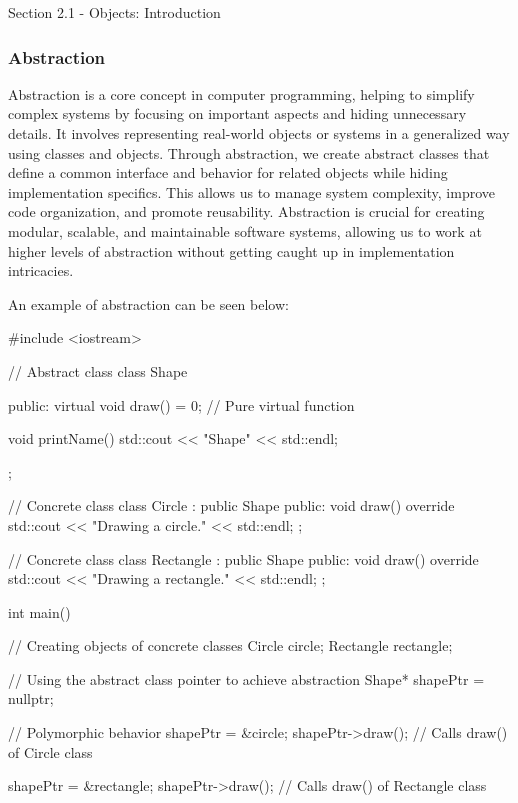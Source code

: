 \begin{notes}{Section 2.1 - Objects: Introduction}
    \subsubsection*{Abstraction}
    
    Abstraction is a core concept in computer programming, helping to simplify complex systems by focusing on important aspects and hiding unnecessary details. It involves representing real-world objects or systems in a generalized 
    way using classes and objects. Through abstraction, we create abstract classes that define a common interface and behavior for related objects while hiding implementation specifics. This allows us to manage system complexity, 
    improve code organization, and promote reusability. Abstraction is crucial for creating modular, scalable, and maintainable software systems, allowing us to work at higher levels of abstraction without getting caught up in implementation intricacies.
    
    \begin{highlight}
        An example of abstraction can be seen below:
    \begin{code}[C++]
    #include <iostream>

    // Abstract class
    class Shape {
    public:
        virtual void draw() = 0;  // Pure virtual function
        
        void printName() {
            std::cout << "Shape" << std::endl;
        }
    };

    // Concrete class
    class Circle : public Shape {
    public:
        void draw() override {
            std::cout << "Drawing a circle." << std::endl;
        }
    };

    // Concrete class
    class Rectangle : public Shape {
    public:
        void draw() override {
            std::cout << "Drawing a rectangle." << std::endl;
        }
    };

    int main() {
        // Creating objects of concrete classes
        Circle circle;
        Rectangle rectangle;
        
        // Using the abstract class pointer to achieve abstraction
        Shape* shapePtr = nullptr;
        
        // Polymorphic behavior
        shapePtr = &circle;
        shapePtr->draw();  // Calls draw() of Circle class
        
        shapePtr = &rectangle;
        shapePtr->draw();  // Calls draw() of Rectangle class
        
}
\end{code}
\end{highlight}
\end{notes}
